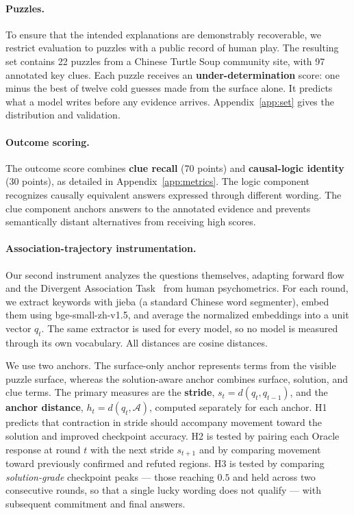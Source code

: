 \documentclass{article}
\begin{document}
\paragraph{Puzzles.}
To ensure that the intended explanations are demonstrably recoverable, we
restrict evaluation to puzzles with a public record of human play. The
resulting set contains 22 puzzles from a Chinese Turtle Soup community site,
with 97 annotated key clues. Each puzzle receives an \textbf{under-determination} score: one minus the best of twelve cold guesses made from the surface alone. It predicts what a model writes before any evidence arrives. Appendix~\ref{app:set} gives the distribution and validation.



\paragraph{Outcome scoring.}
The outcome score combines \textbf{clue recall} (70 points) and
\textbf{causal-logic identity} (30 points), as detailed in
Appendix~\ref{app:metrics}. The logic component recognizes causally
equivalent answers expressed through different wording. The clue component
anchors answers to the annotated evidence and prevents semantically distant
alternatives from receiving high scores.

\paragraph{Association-trajectory instrumentation.}\label{sec:traj}
Our second instrument analyzes the questions themselves, adapting forward
flow~\cite{forwardflow} and the Divergent Association Task~\cite{dat} from
human psychometrics. For each round, we extract keywords with jieba (a standard Chinese word segmenter), embed
them using bge-small-zh-v1.5, and average the normalized embeddings into a
unit vector $q_t$. The same extractor is used for every model, so no model is measured through its own vocabulary. All distances are cosine distances.

We use two anchors. The surface-only anchor represents terms from the visible
puzzle surface, whereas the solution-aware anchor combines surface, solution,
and clue terms. The primary measures are the \textbf{stride},
$s_t=d(q_t,q_{t-1})$, and the \textbf{anchor distance},
$h_t=d(q_t,\mathcal{A})$, computed separately for each anchor. H1 predicts
that contraction in stride should accompany movement toward the solution and
improved checkpoint accuracy. H2 is tested by pairing each Oracle response at
round $t$ with the next stride $s_{t+1}$ and by comparing movement toward
previously confirmed and refuted regions. H3 is tested by comparing
\emph{solution-grade} checkpoint peaks --- those reaching $0.5$ and held
across two consecutive rounds, so that a single lucky wording does not
qualify --- with subsequent commitment and final answers.
\end{document}
